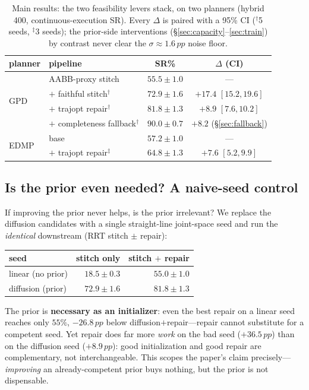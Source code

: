 \documentclass[10pt,twocolumn]{article}
\newcommand{\pp}{\,pp}
\begin{document}
\begin{table}[t]\centering\small
\caption{Main results: the two feasibility levers stack, on two planners (hybrid 400,
continuous-execution SR). Every $\Delta$ is paired with a 95\% CI ($^{\dagger}$5 seeds,
$^{\ddagger}$3 seeds); the prior-side interventions (\S\ref{sec:capacity}--\ref{sec:train})
by contrast never clear the $\sigma{\approx}1.6\pp$ noise floor.}
\label{tab:main}
\begin{tabular}{llcc}
\toprule
planner & pipeline & SR\% & $\Delta$ (CI) \\
\midrule
\multirow{4}{*}{GPD}
 & AABB-proxy stitch      & $55.5{\pm}1.0$ & --- \\
 & \;$+$ faithful stitch$^{\dagger}$  & $72.9{\pm}1.6$ & $+17.4$ $[15.2,19.6]$ \\
 & \;$+$ trajopt repair$^{\dagger}$   & $81.8{\pm}1.3$ & $+8.9$ $[7.6,10.2]$ \\
 & \;$+$ completeness fallback$^{\dagger}$ & $\mathbf{90.0{\pm}0.7}$ & $+8.2$ (\S\ref{sec:fallback}) \\
\midrule
\multirow{2}{*}{EDMP}
 & base                   & $57.2{\pm}1.0$ & --- \\
 & \;$+$ trajopt repair$^{\ddagger}$  & $\mathbf{64.8{\pm}1.3}$ & $+7.6$ $[5.2,9.9]$ \\
\bottomrule
\end{tabular}
\end{table}

\subsection{Is the prior even needed? A naive-seed control}
\label{sec:naive}
If improving the prior never helps, is the prior irrelevant? We replace the
diffusion candidates with a single straight-line joint-space seed and run the
\emph{identical} downstream (RRT stitch $\pm$ repair):

\begin{center}\small
\begin{tabular}{lrr}
\toprule
seed & stitch only & stitch $+$ repair \\
\midrule
linear (no prior) & $18.5{\pm}0.3$ & $55.0{\pm}1.0$ \\
diffusion (prior) & $72.9{\pm}1.6$ & $81.8{\pm}1.3$ \\
\bottomrule
\end{tabular}
\end{center}

The prior is \textbf{necessary as an initializer}: even the best repair on a linear
seed reaches only $55\%$, $-26.8\pp$ below diffusion$+$repair---repair cannot
substitute for a competent seed. Yet repair does far more \emph{work} on the bad
seed ($+36.5\pp$) than on the diffusion seed ($+8.9\pp$): good initialization and
good repair are complementary, not interchangeable. This scopes the paper's claim
precisely---\emph{improving} an already-competent prior buys nothing, but the prior
is not dispensable.
\end{document}
